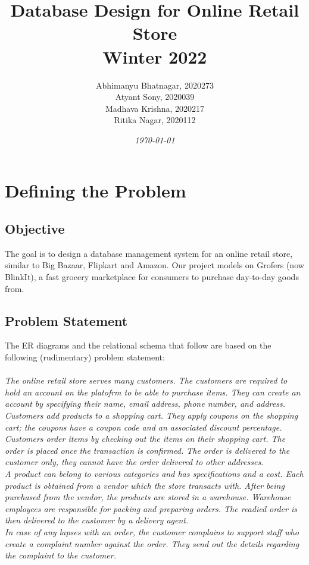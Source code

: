 \documentclass[12pt]{report}
\title{
    \textbf{Database Design for Online Retail Store\\ Winter 2022 \\}
}
\author{Abhimanyu Bhatnagar, 2020273
        \\Atyant Sony, 2020039
        \\Madhava Krishna, 2020217
        \\Ritika Nagar, 2020112}
\date{\textit{\today}}
\begin{document}
    \maketitle
    \tableofcontents
    \pagebreak

    \chapter{Defining the Problem}
    \section{Objective}
        The goal is to design a database management system for an online retail store,
        similar to Big Bazaar, Flipkart and Amazon. Our project models on Grofers (now BlinkIt), 
        a fast grocery marketplace for consumers to purchase day-to-day goods from.
    
    \section{Problem Statement}
    The ER diagrams and the relational schema that follow are based on the following (rudimentary) problem statement:
    \\\\
    \textit{
        The online retail store serves many customers. 
        The customers are required to hold an account on the platofrm to be able to purchase items.
        They can create an account by specifying their name, email address, phone number, and address.
        Customers add products to a shopping cart. They apply coupons on the shopping cart; the coupons 
        have a coupon code and an associated discount percentage.\\
        Customers order items by checking out the items on their shopping cart. The order is placed once the
         transaction is confirmed. The order is delivered to the customer only, 
         they cannot have the order delivered to other addresses.
        \\
        A product can belong to various categories and has specifications and a cost. Each
        product is obtained from a vendor which the store transacts with. After being purchased from 
        the vendor, the products are stored in a warehouse. Warehouse employees are responsible for packing 
        and preparing orders. The readied order is then delivered to the customer by a delivery agent.
        \\
        In case of any lapses with an order, the customer complains to support staff who create a complaint
        number against the order. They send out the details regarding the complaint to the customer.
    }
\end{document}
